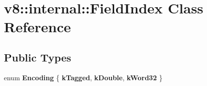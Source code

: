 \hypertarget{classv8_1_1internal_1_1FieldIndex}{}\section{v8\+:\+:internal\+:\+:Field\+Index Class Reference}
\label{classv8_1_1internal_1_1FieldIndex}
\subsection*{Public Types}
\begin{DoxyCompactItemize}
\item 
\mbox{\label{classv8_1_1internal_1_1FieldIndex_a364cda7a37a67016a162b71dbe0bc507}} 
enum {\bfseries Encoding} \{ {\bfseries k\+Tagged}, 
{\bfseries k\+Double}, 
{\bfseries k\+Word32}
 \}
\end{DoxyCompactItemize}
